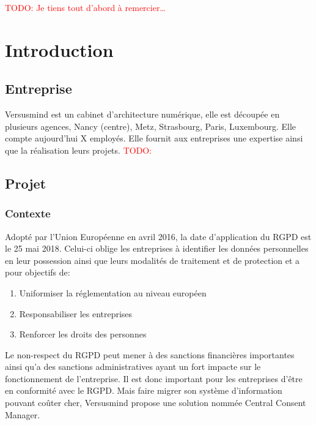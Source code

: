 \documentclass[12pt, a4paper]{report}
\makeatletter
\newcommand\tab[1][1cm]{\hspace*{#1}}
\newcommand\TODO[1]{\textcolor{red}{TODO\@: #1}}
\makeatother
\begin{document}
	\makeutbmfrontcover{}
        \TODO{Je tiens tout d'abord à remercier\ldots}
    \newpage
    \tableofcontents
    \chapter{Introduction}
        \section{Entreprise}
            \tab{} Versusmind est un cabinet d'architecture numérique, elle est découpée en plusieurs agences, Nancy (centre), Metz, Strasbourg, Paris, Luxembourg.\newline
            Elle compte aujourd'hui X employés. Elle fournit aux entreprises une expertise ainsi que la réalisation leurs projets.
            \TODO{}
        \section{Projet}
            \subsection{Contexte}
                \tab{} Adopté par l’Union Européenne en avril 2016, la date d’application du RGPD est le 25 mai 2018. Celui-ci oblige les entreprises à identifier les données personnelles en leur possession ainsi que leurs modalités de traitement et de protection et a pour objectifs de\@:
                \begin{enumerate}
                    \item Uniformiser la réglementation au niveau européen
                    \item Responsabiliser les entreprises
                    \item Renforcer les droits des personnes
                \end{enumerate}
                \tab{} Le non-respect du RGPD peut mener à des sanctions financières importantes ainsi qu'a des sanctions administratives ayant un fort impacte sur le fonctionnement de l'entreprise.
                Il est donc important pour les entreprises d'être en conformité avec le RGPD.\newline
                Mais faire migrer son système d'information pouvant coûter cher, Versusmind propose une solution nommée Central Consent Manager.
\end{document}
